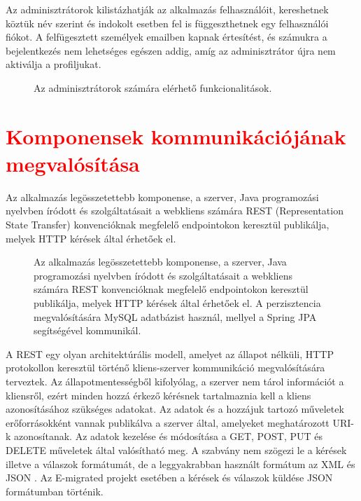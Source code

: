 Az adminisztrátorok kilistázhatják az alkalmazás felhasználóit, kereshetnek köztük név szerint és indokolt esetben fel is függeszthetnek egy felhasználói fiókot. A felfügesztett személyek emailben kapnak értesítést, és számukra a bejelentkezés nem lehetséges egészen addig, amíg az adminisztrátor újra nem aktiválja a profiljukat. 

\begin{figure}
  \centering
  \caption{Az adminisztrátorok számára elérhető funkcionalitások.}
  \label{fig:admin_use_case}
\end{figure}

\section{\textcolor{red}{Komponensek kommunikációjának megvalósítása}}\label{sec:projektrol:kommunikacio}
Az alkalmazás legösszetettebb komponense, a szerver, Java programozási nyelvben íródott és szolgáltatásait a webkliens számára REST (Representation State Transfer) konvencióknak megfelelő endpointokon keresztül publikálja, melyek HTTP kérések által érhetőek el. 
\begin{figure}[!b]
  \centering
  \caption{Az alkalmazás legösszetettebb komponense, a szerver, Java programozási nyelvben íródott és szolgáltatásait a webkliens számára REST konvencióknak megfelelő endpointokon keresztül publikálja, melyek HTTP kérések által érhetőek el. A perzisztencia megvalósítására MySQL adatbázist használ, mellyel a Spring JPA segítségével kommunikál.}
  \label{fig:kommunikacio}
\end{figure}

A REST egy olyan architektúrális modell, amelyet az állapot nélküli, HTTP protokollon keresztül történő kliens-szerver kommunikáció megvalósítására terveztek. Az állapotmentességből kifolyólag, a szerver nem tárol információt a kliensről, ezért minden hozzá érkező kérésnek tartalmaznia kell a kliens azonosításához szükséges adatokat. Az adatok és a hozzájuk tartozó műveletek erőforrásokként vannak publikálva a szerver által, amelyeket meghatározott URI-k azonosítanak. Az adatok kezelése és módosítása a GET, POST, PUT és DELETE műveletek által valósítható meg. A szabvány nem szögezi le a kérések illetve a válaszok formátumát, de a leggyakrabban használt formátum az XML és JSON \cite{REST}. Az E-migrated projekt esetében a kérések és válaszok küldése JSON formátumban történik.  

